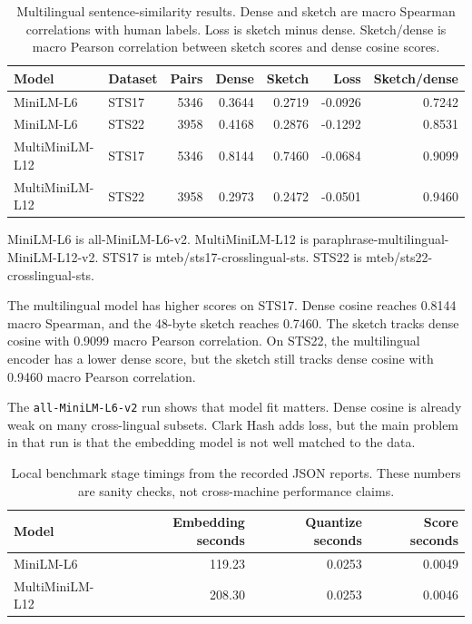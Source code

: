 \documentclass[11pt]{article}
\newcommand{\code}[1]{\texttt{#1}}
\begin{document}
\begin{table}[t]
\centering
\footnotesize
\setlength{\tabcolsep}{5pt}
\caption{Multilingual sentence-similarity results. Dense and sketch are macro
Spearman correlations with human labels. Loss is sketch minus dense.
Sketch/dense is macro Pearson correlation between sketch scores and dense cosine
scores.}
\label{tab:sts-results}
\begin{tabular}{llrrrrr}
\toprule
Model & Dataset & Pairs & Dense & Sketch & Loss & Sketch/dense \\
\midrule
MiniLM-L6 & STS17 & 5346 & 0.3644 & 0.2719 & -0.0926 & 0.7242 \\
MiniLM-L6 & STS22 & 3958 & 0.4168 & 0.2876 & -0.1292 & 0.8531 \\
MultiMiniLM-L12 & STS17 & 5346 & 0.8144 & 0.7460 & -0.0684 & 0.9099 \\
MultiMiniLM-L12 & STS22 & 3958 & 0.2973 & 0.2472 & -0.0501 & 0.9460 \\
\bottomrule
\end{tabular}

\vspace{0.35em}
\begin{minipage}{0.94\linewidth}
\footnotesize
MiniLM-L6 is all-MiniLM-L6-v2. MultiMiniLM-L12 is
paraphrase-multilingual-MiniLM-L12-v2. STS17 is
mteb/sts17-crosslingual-sts. STS22 is mteb/sts22-crosslingual-sts.
\end{minipage}
\end{table}

The multilingual model has higher scores on STS17. Dense cosine reaches 0.8144 macro
Spearman, and the 48-byte sketch reaches 0.7460. The sketch tracks dense cosine
with 0.9099 macro Pearson correlation. On STS22, the multilingual encoder has a
lower dense score, but the sketch still tracks dense cosine with 0.9460 macro
Pearson correlation.

The \code{all-MiniLM-L6-v2} run shows that model fit matters. Dense cosine is
already weak on many cross-lingual subsets. Clark Hash adds loss, but the main
problem in that run is that the embedding model is not well matched to the data.

\begin{table}[t]
\centering
\small
\caption{Local benchmark stage timings from the recorded JSON reports. These
numbers are sanity checks, not cross-machine performance claims.}
\label{tab:timing}
\begin{tabular}{lrrr}
\toprule
Model & Embedding seconds & Quantize seconds & Score seconds \\
\midrule
MiniLM-L6 & 119.23 & 0.0253 & 0.0049 \\
MultiMiniLM-L12 & 208.30 & 0.0253 & 0.0046 \\
\bottomrule
\end{tabular}
\end{table}
\end{document}
